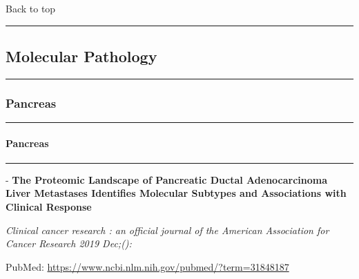\documentclass[
]{article}
\renewcommand{\linethickness}{0.05em}
\begin{document}
Back to top

\begin{center}\rule{0.5\linewidth}{\linethickness}\end{center}

\pagebreak

\hypertarget{molecular-pathology}{%
\subsection{Molecular Pathology}\label{molecular-pathology}}

\begin{center}\rule{0.5\linewidth}{\linethickness}\end{center}

\hypertarget{pancreas-2}{%
\subsubsection{Pancreas}\label{pancreas-2}}

\begin{center}\rule{0.5\linewidth}{\linethickness}\end{center}

\hypertarget{pancreas-3}{%
\paragraph{Pancreas}\label{pancreas-3}}

\begin{center}\rule{0.5\linewidth}{\linethickness}\end{center}

- \textbf{The Proteomic Landscape of Pancreatic Ductal Adenocarcinoma
Liver Metastases Identifies Molecular Subtypes and Associations with
Clinical Response}

\emph{Clinical cancer research : an official journal of the American
Association for Cancer Research 2019 Dec;():}

PubMed: \url{https://www.ncbi.nlm.nih.gov/pubmed/?term=31848187}
\end{document}
